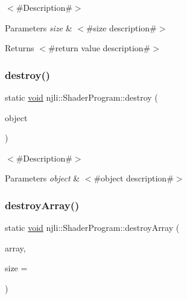 $<$\#\+Description\#$>$


\begin{DoxyParams}{Parameters}
{\em size} & $<$\#size description\#$>$\\
\hline
\end{DoxyParams}
\begin{DoxyReturn}{Returns}
$<$\#return value description\#$>$ 
\end{DoxyReturn}
\mbox{\label{classnjli_1_1_shader_program_ae162b5b68d88e47b14b507fec798da1c}} 
\subsubsection{\texorpdfstring{destroy()}{destroy()}}
{\footnotesize\ttfamily static \mbox{\hyperlink{_thread_8h_af1e856da2e658414cb2456cb6f7ebc66}{void}} njli\+::\+Shader\+Program\+::destroy (\begin{DoxyParamCaption}\item[{\mbox{\hyperlink{classnjli_1_1_shader_program}{Shader\+Program}} $\ast$}]{object }\end{DoxyParamCaption})\hspace{0.3cm}{\ttfamily [static]}}

$<$\#\+Description\#$>$


\begin{DoxyParams}{Parameters}
{\em object} & $<$\#object description\#$>$ \\
\hline
\end{DoxyParams}
\mbox{\label{classnjli_1_1_shader_program_a86ca7eb980e28330ee6ca6a7d17e0a12}} 
\subsubsection{\texorpdfstring{destroy\+Array()}{destroyArray()}}
{\footnotesize\ttfamily static \mbox{\hyperlink{_thread_8h_af1e856da2e658414cb2456cb6f7ebc66}{void}} njli\+::\+Shader\+Program\+::destroy\+Array (\begin{DoxyParamCaption}\item[{\mbox{\hyperlink{classnjli_1_1_shader_program}{Shader\+Program}} $\ast$$\ast$}]{array,  }\item[{const \mbox{\hyperlink{_util_8h_a10e94b422ef0c20dcdec20d31a1f5049}{u32}}}]{size = {} }\end{DoxyParamCaption})\hspace{0.3cm}{\ttfamily [static]}}

